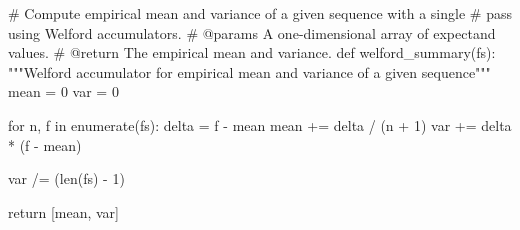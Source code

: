 \documentclass[
  letterpaper,
  DIV=11,
  numbers=noendperiod]{scrartcl}
\newenvironment{Shaded}{\begin{snugshade}}{\end{snugshade}}
\newcommand{\BuiltInTok}[1]{\textcolor[rgb]{0.00,0.23,0.31}{#1}}
\newcommand{\CommentTok}[1]{\textcolor[rgb]{0.37,0.37,0.37}{#1}}
\newcommand{\ControlFlowTok}[1]{\textcolor[rgb]{0.00,0.23,0.31}{#1}}
\newcommand{\DecValTok}[1]{\textcolor[rgb]{0.68,0.00,0.00}{#1}}
\newcommand{\KeywordTok}[1]{\textcolor[rgb]{0.00,0.23,0.31}{#1}}
\newcommand{\NormalTok}[1]{\textcolor[rgb]{0.00,0.23,0.31}{#1}}
\newcommand{\OperatorTok}[1]{\textcolor[rgb]{0.37,0.37,0.37}{#1}}
\begin{document}
\begin{Shaded}
\begin{Highlighting}[]
\CommentTok{\# Compute empirical mean and variance of a given sequence with a single}
\CommentTok{\# pass using Welford accumulators.}
\CommentTok{\# @params A one{-}dimensional array of expectand values.}
\CommentTok{\# @return The empirical mean and variance.}
\KeywordTok{def}\NormalTok{ welford\_summary(fs):}
  \CommentTok{"""Welford accumulator for empirical mean and variance of a}
\CommentTok{     given sequence"""}
\NormalTok{  mean }\OperatorTok{=} \DecValTok{0}
\NormalTok{  var }\OperatorTok{=} \DecValTok{0}
  
  \ControlFlowTok{for}\NormalTok{ n, f }\KeywordTok{in} \BuiltInTok{enumerate}\NormalTok{(fs):}
\NormalTok{    delta }\OperatorTok{=}\NormalTok{ f }\OperatorTok{{-}}\NormalTok{ mean}
\NormalTok{    mean }\OperatorTok{+=}\NormalTok{ delta }\OperatorTok{/}\NormalTok{ (n }\OperatorTok{+} \DecValTok{1}\NormalTok{)}
\NormalTok{    var }\OperatorTok{+=}\NormalTok{ delta }\OperatorTok{*}\NormalTok{ (f }\OperatorTok{{-}}\NormalTok{ mean)}
    
\NormalTok{  var }\OperatorTok{/=}\NormalTok{ (}\BuiltInTok{len}\NormalTok{(fs) }\OperatorTok{{-}} \DecValTok{1}\NormalTok{)}
  
  \ControlFlowTok{return}\NormalTok{ [mean, var]}
\end{Highlighting}
\end{Shaded}
\end{document}
